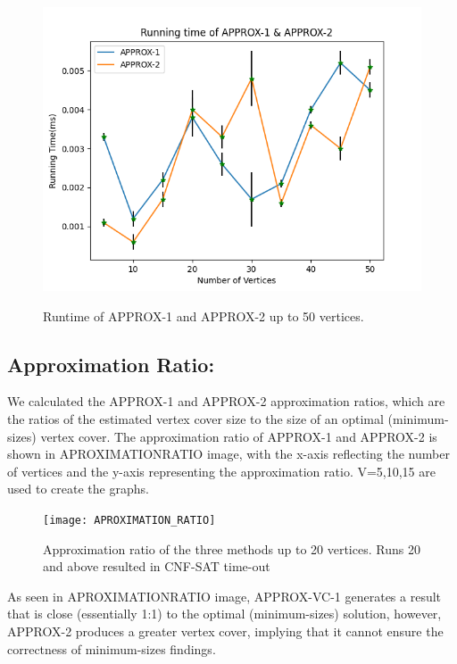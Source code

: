 \documentclass[11pt roman]{article}
\begin{document}
\begin{figure}[H]
	\includegraphics[scale=0.6]{RunningTimeOf_VC1_And_VC2_}\\ %
	\centering
	\caption{Runtime of APPROX-1 and APPROX-2 up to 50 vertices.}
\end{figure}


\subsection{ Approximation Ratio:}
We calculated the APPROX-1 and APPROX-2 approximation ratios, which are the ratios of the estimated vertex cover size to the size of an optimal (minimum-sizes) vertex cover. The approximation ratio of APPROX-1 and APPROX-2 is shown in APROXIMATIONRATIO image, with the x-axis reflecting the number of vertices and the y-axis representing the approximation ratio. V=5,10,15 are used to create the graphs.

\begin{figure}[H]%
	\texttt{[image: APROXIMATION\_RATIO]}\\ %
	\centering
	\caption{Approximation ratio of the three methods up to 20 vertices. Runs 20 and above resulted in CNF-SAT time-out}
\end{figure}

As seen in APROXIMATIONRATIO image, APPROX-VC-1 generates a result that is close (essentially 1:1) to the optimal (minimum-sizes) solution, however, APPROX-2 produces a greater vertex cover, implying that it cannot ensure the correctness of minimum-sizes findings.
\end{document}

